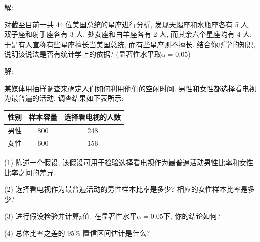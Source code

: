 \documentclass[standard]{ExBook}
\begin{document}
\begin{qitems}
\vspace{-5em}

    \begin{bbox}
解: 
    \end{bbox}

\vspace{-5em}

    \begin{bbox}
    \begin{shaded}
        \qitem
对截至目前一共 44 位美国总统的星座进行分析, 发现天蝎座和水瓶座各有 5 人, 双子座和射手座各有 3 人, 处女座和白羊座各有 2 人, 而其余六个星座均有 4 人. 于是有人宣称有些星座擅长当美国总统, 而有些星座则不擅长. 结合你所学的知识, 说明该说法是否有统计学上的依据? (显著性水平取$\alpha=0.05$)
    \end{shaded}
    \end{bbox}

\vspace{-5em}

    \begin{bbox}
解: 
    \end{bbox}

\vspace{-5em}

    \begin{bbox}
    \begin{shaded}
        \qitem
某媒体用抽样调查来确定人们如何利用他们的空闲时间. 男性和女性都选择看电视为最普遍的活动. 调查结果如下表所示:
\begin{center}
\setlength{\tabcolsep}{52pt}
\begin{tabular}{c|c|c}
\hline
性别 & 样本容量 & 选择看电视的人数 \\
\hline
男性 & 800 & 248 \\
女性 & 600 & 156 \\
\hline
\end{tabular}
\end{center}
(1) 陈述一个假设, 该假设可用于检验选择看电视作为最普遍活动男性比率和女性比率之间的差异.

(2) 选择看电视作为最普遍活动的男性样本比率是多少? 相应的女性样本比率是多少?

(3) 进行假设检验并计算$p$值. 在显著性水平$\alpha=0.05$下, 你的结论如何?

(4) 总体比率之差的 95\% 置信区间估计是什么?
    \end{shaded}
    \end{bbox}

\vspace{-5em}


\end{qitems}
\end{document}
